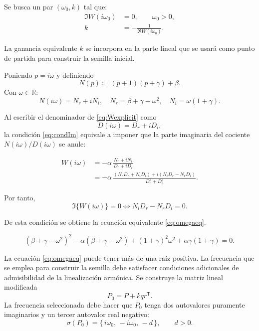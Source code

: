 \documentclass[journal]{IEEEtran}
\begin{document}
\noindent Se busca un par $(\omega_0,k)$ tal que:
\begin{align}
\Im W(i\omega_0)&=0,\qquad \omega_0>0, \label{eq:condIm}\\
k&=-\frac{1}{\Re W(i\omega_0)}.\label{eq:condk}
\end{align}

La ganancia equivalente \(k\) se incorpora en la parte lineal que se usará como punto de partida para construir la semilla inicial.

\noindent Poniendo $p=i\omega$ y definiendo
\begin{equation}\label{eq:Np}
  N(p)\coloneqq (p+1)(p+\gamma)+\beta.
\end{equation}
Con $\omega\in\mathbb{R}$:
\[
N(i\omega)=N_r+iN_i,\quad N_r=\beta+\gamma-\omega^2,\quad N_i=\omega(1+\gamma).
\]

Al escribir el denominador de \eqref{eq:Wexplicit} como
\[
D(i\omega)=D_r+iD_i,
\]
la condición \eqref{eq:condIm} equivale a imponer que la parte imaginaria del cociente $N(i\omega)/D(i\omega)$ se anule:

\begin{equation}
\begin{aligned}
W(i\omega)
&=-\alpha\,\frac{N_r+iN_i}{D_r+iD_i}\\
&=-\alpha\,\frac{(N_rD_r+N_iD_i)+i(N_iD_r-N_rD_i)}{D_r^2+D_i^2}.
\end{aligned}
\end{equation}

Por tanto,
\begin{equation}
\Im\{W(i\omega)\}=0
\iff N_iD_r-N_rD_i=0.
\end{equation}

De esta condición se obtiene la ecuación equivalente \eqref{eq:omegaeq}.

\begin{equation}\label{eq:omegaeq}
(\beta+\gamma-\omega^2)^2
-\alpha(\beta+\gamma-\omega^2)
+(1+\gamma)^2\omega^2
+\alpha\gamma(1+\gamma)=0.
\end{equation}

\noindent La ecuación \eqref{eq:omegaeq} puede tener más de una raíz positiva. La frecuencia que se emplea para construir la semilla debe satisfacer condiciones adicionales de admisibilidad de la linealización armónica\cite{GuanXie2025,KuznetsovEtAl2017}. Se construye la matriz lineal modificada
\begin{equation}\label{eq:P0}
P_0=P+kqr^\mathsf{T}.
\end{equation}
La frecuencia seleccionada debe hacer que \(P_0\) tenga dos autovalores
puramente imaginarios y un tercer autovalor real negativo:
\[
\sigma(P_0)=\{\,i\omega_0,\,-i\omega_0,\,-d\,\},
\qquad d>0.
\]
\end{document}
